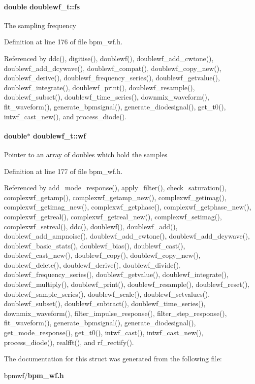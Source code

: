 \paragraph[fs]{\setlength{\rightskip}{0pt plus 5cm}double {\bf doublewf\_\-t::fs}}\hfill\label{structdoublewf__t_b7359d3a743515a232061bf6453ff51c}


The sampling frequency 

Definition at line 176 of file bpm\_\-wf.h.

Referenced by ddc(), digitise(), doublewf(), doublewf\_\-add\_\-cwtone(), doublewf\_\-add\_\-dcywave(), doublewf\_\-compat(), doublewf\_\-copy\_\-new(), doublewf\_\-derive(), doublewf\_\-frequency\_\-series(), doublewf\_\-getvalue(), doublewf\_\-integrate(), doublewf\_\-print(), doublewf\_\-resample(), doublewf\_\-subset(), doublewf\_\-time\_\-series(), downmix\_\-waveform(), fit\_\-waveform(), generate\_\-bpmsignal(), generate\_\-diodesignal(), get\_\-t0(), intwf\_\-cast\_\-new(), and process\_\-diode().
\paragraph[wf]{\setlength{\rightskip}{0pt plus 5cm}double$\ast$ {\bf doublewf\_\-t::wf}}\hfill\label{structdoublewf__t_dc4cb6d4fa6bd72c1c252d00cbf2f2a4}


Pointer to an array of doubles which hold the samples 

Definition at line 177 of file bpm\_\-wf.h.

Referenced by add\_\-mode\_\-response(), apply\_\-filter(), check\_\-saturation(), complexwf\_\-getamp(), complexwf\_\-getamp\_\-new(), complexwf\_\-getimag(), complexwf\_\-getimag\_\-new(), complexwf\_\-getphase(), complexwf\_\-getphase\_\-new(), complexwf\_\-getreal(), complexwf\_\-getreal\_\-new(), complexwf\_\-setimag(), complexwf\_\-setreal(), ddc(), doublewf(), doublewf\_\-add(), doublewf\_\-add\_\-ampnoise(), doublewf\_\-add\_\-cwtone(), doublewf\_\-add\_\-dcywave(), doublewf\_\-basic\_\-stats(), doublewf\_\-bias(), doublewf\_\-cast(), doublewf\_\-cast\_\-new(), doublewf\_\-copy(), doublewf\_\-copy\_\-new(), doublewf\_\-delete(), doublewf\_\-derive(), doublewf\_\-divide(), doublewf\_\-frequency\_\-series(), doublewf\_\-getvalue(), doublewf\_\-integrate(), doublewf\_\-multiply(), doublewf\_\-print(), doublewf\_\-resample(), doublewf\_\-reset(), doublewf\_\-sample\_\-series(), doublewf\_\-scale(), doublewf\_\-setvalues(), doublewf\_\-subset(), doublewf\_\-subtract(), doublewf\_\-time\_\-series(), downmix\_\-waveform(), filter\_\-impulse\_\-response(), filter\_\-step\_\-response(), fit\_\-waveform(), generate\_\-bpmsignal(), generate\_\-diodesignal(), get\_\-mode\_\-response(), get\_\-t0(), intwf\_\-cast(), intwf\_\-cast\_\-new(), process\_\-diode(), realfft(), and rf\_\-rectify().

The documentation for this struct was generated from the following file:\begin{CompactItemize}
\item 
bpmwf/{\bf bpm\_\-wf.h}\end{CompactItemize}
